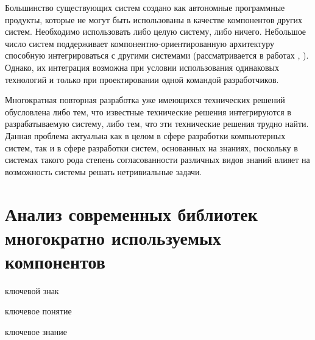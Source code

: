 Большинство существующих систем создано как автономные программные продукты, которые не могут быть использованы в качестве компонентов других систем. Необходимо использовать либо целую систему, либо ничего. Небольшое число систем поддерживает компонентно-ориентированную архитектуру способную интегрироваться с другими системами (рассматривается в работах , ). Однако, их интеграция возможна при условии использования одинаковых технологий и только при проектировании одной командой разработчиков.

Многократная повторная разработка уже имеющихся технических решений обусловлена либо тем, что известные технические решения  интегрируются в разрабатываемую систему, либо тем, что эти технические решения трудно найти. Данная проблема актуальна как в целом в сфере разработки компьютерных систем, так и в сфере разработки систем, основанных на знаниях, поскольку в системах такого рода степень согласованности различных видов знаний влияет на возможность системы решать нетривиальные задачи.

\section{Анализ современных библиотек многократно используемых компонентов}
\label{ostis_library_analysis}

\begin{SCn}
	\begin{scnrelfromlist}{ключевой знак}
	\end{scnrelfromlist}
\end{SCn}

\begin{SCn}
	\begin{scnrelfromlist}{ключевое понятие}
	\end{scnrelfromlist}
\end{SCn}

\begin{SCn}
	\begin{scnrelfromlist}{ключевое знание}
	\end{scnrelfromlist}
\end{SCn}

\bigskip


